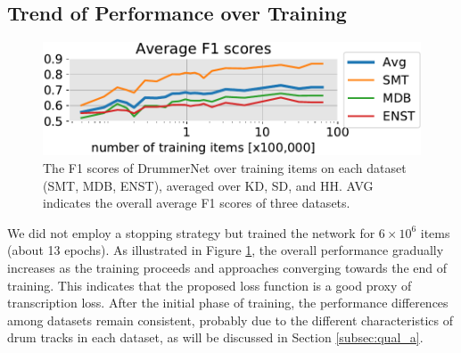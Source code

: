 \documentclass{article}
\newcommand{\squeeze}{\vspace{-0.15cm}}
\newcommand{\smallsqueeze}{\vspace{-0.1cm}}
\begin{document}
	\smallsqueeze
	\subsection{Trend of Performance over Training}
	\begin{figure}[t]
		\centering
		\includegraphics[width=\columnwidth]{results_DFL_overtime.pdf}
		\caption{The F1 scores of DrummerNet over training items on each dataset (SMT, MDB, ENST), averaged over KD, SD, and HH. AVG indicates the overall average F1 scores of three datasets.}
		\label{fig:trend}
	\end{figure}
	\squeeze
	
	We did not employ a stopping strategy but trained the network for $6 \times 10^6$ items (about 13 epochs). As illustrated in Figure \ref{fig:trend}, the overall performance gradually increases as the training proceeds and approaches converging towards the end of training. This indicates that the proposed loss function is a good proxy of transcription loss. After the initial phase of training, the performance differences among datasets remain consistent, probably due to the different characteristics of drum tracks in each dataset, as will be discussed in Section \ref{subsec:qual_a}.
	
	\smallsqueeze
\end{document}

